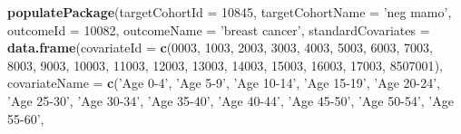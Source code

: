 \documentclass[
]{article}
\newenvironment{Shaded}{\begin{snugshade}}{\end{snugshade}}
\newcommand{\DataTypeTok}[1]{\textcolor[rgb]{0.13,0.29,0.53}{#1}}
\newcommand{\DecValTok}[1]{\textcolor[rgb]{0.00,0.00,0.81}{#1}}
\newcommand{\KeywordTok}[1]{\textcolor[rgb]{0.13,0.29,0.53}{\textbf{#1}}}
\newcommand{\NormalTok}[1]{#1}
\newcommand{\StringTok}[1]{\textcolor[rgb]{0.31,0.60,0.02}{#1}}
\begin{document}
\begin{Shaded}
\begin{Highlighting}[]
\KeywordTok{populatePackage}\NormalTok{(}\DataTypeTok{targetCohortId =} \DecValTok{10845}\NormalTok{,}
                \DataTypeTok{targetCohortName =} \StringTok{'neg mamo'}\NormalTok{,}
                \DataTypeTok{outcomeId =} \DecValTok{10082}\NormalTok{,}
                \DataTypeTok{outcomeName =} \StringTok{'breast cancer'}\NormalTok{,}
                \DataTypeTok{standardCovariates =} \KeywordTok{data.frame}\NormalTok{(}\DataTypeTok{covariateId =} \KeywordTok{c}\NormalTok{(}\DecValTok{0003}\NormalTok{, }\DecValTok{1003}\NormalTok{,}
                                                                \DecValTok{2003}\NormalTok{, }\DecValTok{3003}\NormalTok{,}
                                                                \DecValTok{4003}\NormalTok{, }\DecValTok{5003}\NormalTok{,}
                                                                \DecValTok{6003}\NormalTok{, }\DecValTok{7003}\NormalTok{,}
                                                                \DecValTok{8003}\NormalTok{, }\DecValTok{9003}\NormalTok{,}
                                                                \DecValTok{10003}\NormalTok{, }\DecValTok{11003}\NormalTok{,}
                                                                \DecValTok{12003}\NormalTok{, }\DecValTok{13003}\NormalTok{,}
                                                                \DecValTok{14003}\NormalTok{, }\DecValTok{15003}\NormalTok{,}
                                                                \DecValTok{16003}\NormalTok{, }\DecValTok{17003}\NormalTok{,}
                                                                \DecValTok{8507001}\NormalTok{),}
                                                \DataTypeTok{covariateName =} \KeywordTok{c}\NormalTok{(}\StringTok{'Age 0-4'}\NormalTok{, }\StringTok{'Age 5-9'}\NormalTok{,}
                                                                  \StringTok{'Age 10-14'}\NormalTok{, }\StringTok{'Age 15-19'}\NormalTok{,}
                                                                  \StringTok{'Age 20-24'}\NormalTok{, }\StringTok{'Age 25-30'}\NormalTok{,}
                                                                  \StringTok{'Age 30-34'}\NormalTok{, }\StringTok{'Age 35-40'}\NormalTok{,}
                                                                  \StringTok{'Age 40-44'}\NormalTok{, }\StringTok{'Age 45-50'}\NormalTok{,}
                                                                  \StringTok{'Age 50-54'}\NormalTok{, }\StringTok{'Age 55-60'}\NormalTok{,}

\end{Highlighting}
\end{Shaded}
\end{document}

